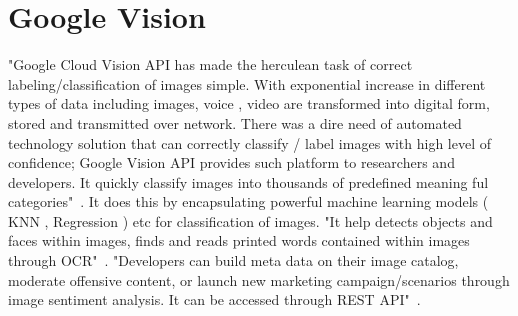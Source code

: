 \section{Google Vision}


"Google Cloud Vision API has made the herculean task of correct 
labeling/classification of images simple. With exponential increase 
in different types of data including images, voice , video are 
transformed into digital form, stored and transmitted over network. 
There was a dire need of automated technology solution that can 
correctly classify / label images with high level of confidence; 
Google Vision API provides such platform to researchers and developers. 
It quickly classify images into thousands of predefined 
meaning ful categories"~\cite{hid-sp18-523-www-google-vision}. 
It does this by encapsulating powerful machine learning 
models ( KNN , Regression ) etc for classification of images. 
"It help detects objects and faces within images, finds and reads 
printed words contained within images through 
OCR"~\cite{hid-sp18-523-www-google-vision}. 
"Developers can build meta data on their image catalog, moderate 
offensive content, or launch new marketing campaign/scenarios through 
image sentiment analysis. It can be accessed 
through REST API"~\cite{hid-sp18-523-www-google-vision}.

